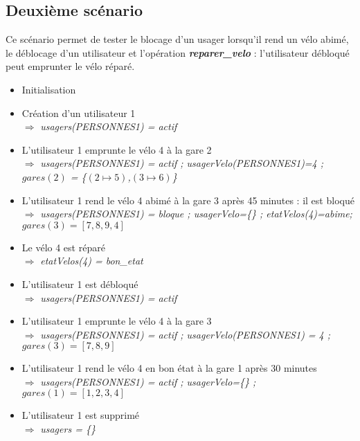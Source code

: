 \documentclass[12pt]{article}
\begin{document}
\subsection{Deuxième scénario}
Ce scénario permet de tester le blocage d'un usager lorsqu'il rend un vélo abimé, le déblocage d'un utilisateur et l'opération \textit{\textbf{reparer\_velo}} : l'utilisateur débloqué peut emprunter le vélo réparé.
\begin{itemize}
  \item Initialisation
  \item Création d'un utilisateur 1 \\
  $\Rightarrow$ \textit{usagers(PERSONNES1) = actif}
  \item L'utilisateur 1 emprunte le vélo 4 à la gare 2 \\
  $\Rightarrow$ \textit{usagers(PERSONNES1) = actif ; usagerVelo(PERSONNES1)=4 ; $gares(2)$ = \{$(2\mapsto5)$,$(3\mapsto6)$\}}
  \item L'utilisateur 1 rend le vélo 4 abimé à la gare 3 après 45 minutes : il est bloqué \\
  $\Rightarrow$ \textit{usagers(PERSONNES1) = bloque ; usagerVelo=\{\} ; etatVelos(4)=abime; $gares(3) = [7,8,9,4]$}
  \item Le vélo 4 est réparé \\
  $\Rightarrow$ \textit{etatVelos(4) = bon\_etat}
  \item L'utilisateur 1 est débloqué \\
  $\Rightarrow$ \textit{usagers(PERSONNES1) = actif}
  \item L'utilisateur 1 emprunte le vélo 4 à la gare 3 \\
  $\Rightarrow$ \textit{usagers(PERSONNES1) = actif ; usagerVelo(PERSONNES1) = 4 ; $gares(3) = [7,8,9]$}
  \item L'utilisateur 1 rend le vélo 4 en bon état à la gare 1 après 30 minutes \\
  $\Rightarrow$ \textit{usagers(PERSONNES1) = actif ; usagerVelo=\{\} ; $gares(1) = [1,2,3,4]$}
  \item L'utilisateur 1 est supprimé \\
  $\Rightarrow$ \textit{usagers = \{\}}
\end{itemize}
\end{document}
